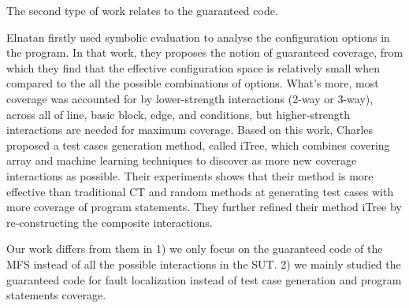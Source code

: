 \documentclass{sig-alternate-05-2015}
\begin{document}
%
%



The second type of work  relates to the guaranteed code.

Elnatan \cite{reisner2010using} firstly used symbolic evaluation to analyse the configuration options in the program. In that work, they proposes the notion of guaranteed coverage, from which they find that the effective configuration space is relatively small when compared to the all the possible combinations of options. What's more, most coverage was accounted for by lower-strength interactions (2-way or 3-way), across all of line, basic block, edge, and conditions, but higher-strength interactions are needed for maximum coverage.  Based on this work, Charles \cite{song2012itree} proposed a test cases generation method, called iTree, which combines covering array and machine learning techniques to discover as more new coverage interactions as possible. Their experiments shows that their method is more effective than traditional CT and random methods at generating test cases with more coverage of program statements. They further refined their method iTree \cite{song2014itree} by re-constructing the composite interactions.

Our work differs from them in 1) we only focus on the guaranteed code of the MFS instead of all the possible interactions in the SUT. 2) we mainly studied the guaranteed code for fault localization instead of test case generation and program statements coverage.
\end{document}
